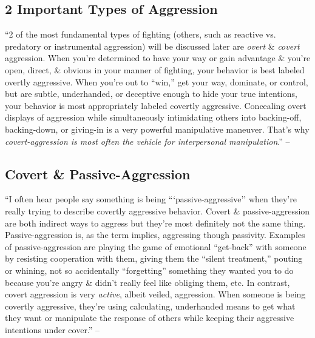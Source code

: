 \documentclass{article}
\numberwithin{equation}{section}
\begin{document}
\subsection{2 Important Types of Aggression}
``2 of the most fundamental types of fighting (others, such as reactive vs. predatory or instrumental aggression) will be discussed later are \textit{overt} \& \textit{covert} aggression. When you're determined to have your way or gain advantage \& you're open, direct, \& obvious in your manner of fighting, your behavior is best labeled overtly aggressive. When you're out to ``win,'' get your way, dominate, or control, but are subtle, underhanded, or deceptive enough to hide your true intentions, your behavior is most appropriately labeled covertly aggressive. Concealing overt displays of aggression while simultaneously intimidating others into backing-off, backing-down, or giving-in is a very powerful manipulative maneuver. That's why \textit{covert-aggression is most often the vehicle for interpersonal manipulation}.'' -- \cite[p. 20]{Simon2010}

\subsection{Covert \& Passive-Aggression}
``I often hear people say something is being ```passive-aggressive'' when they're really trying to describe covertly aggressive behavior. Covert \& passive-aggression are both indirect ways to aggress but they're most definitely not the same thing. Passive-aggression is, as the term implies, aggressing though passivity. Examples of passive-aggression are playing the game of emotional ``get-back'' with someone by resisting cooperation with them, giving them the ``silent treatment,'' pouting or whining, not so accidentally ``forgetting'' something they wanted you to do because you're angry \& didn't really feel like obliging them, etc. In contrast, covert aggression is very \textit{active}, albeit veiled, aggression. When someone is being covertly aggressive, they're using calculating, underhanded means to get what they want or manipulate the response of others while keeping their aggressive intentions under cover.'' -- \cite[pp. 20--21]{Simon2010}
\end{document}
